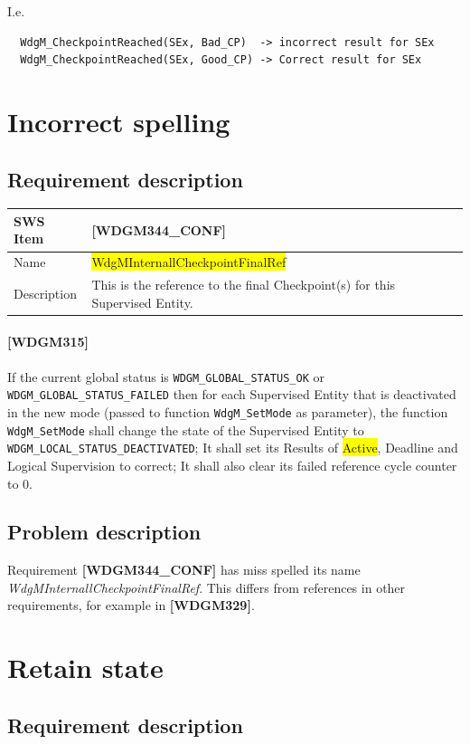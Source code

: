 I.e.
\begin{lstlisting}
  WdgM_CheckpointReached(SEx, Bad_CP)  -> incorrect result for SEx
  WdgM_CheckpointReached(SEx, Good_CP) -> Correct result for SEx
\end{lstlisting}

\section{Incorrect spelling}
\subsection{Requirement description}
\begin{tabular}{| l | l |} \hline
SWS Item & \textbf{[WDGM344\_CONF]}\\\hline
Name     & \colorbox{yellow}{WdgMInternallCheckpointFinalRef}\\\hline
Description & This is the reference to the final Checkpoint(s) for
this Supervised Entity.\\\hline
\end{tabular}

\paragraph{[WDGM315]} If the current global status is
\lstinline!WDGM_GLOBAL_STATUS_OK! or
\lstinline!WDGM_GLOBAL_STATUS_FAILED! then for each Supervised Entity
that is deactivated in the new mode (passed to function
\lstinline!WdgM_SetMode! as parameter), the function
\lstinline!WdgM_SetMode! shall change the state of the Supervised
Entity to\\\lstinline!WDGM_LOCAL_STATUS_DEACTIVATED!; It shall set its
Results of \colorbox{yellow}{Active}, Deadline and Logical Supervision
to correct; It shall also clear its failed reference cycle counter to
0.

\subsection{Problem description}
Requirement \textbf{[WDGM344\_CONF]} has miss spelled its name
\textit{WdgMInternallCheckpointFinalRef}. This differs from references
in other requirements, for example in \textbf{[WDGM329]}.

\section{Retain state}
\subsection{Requirement description}
